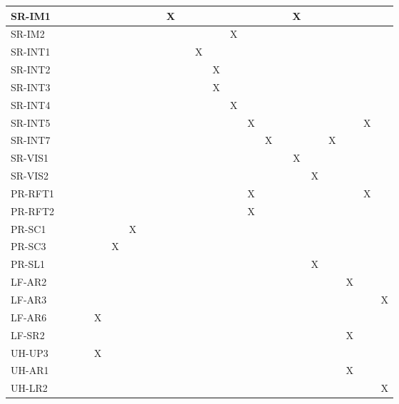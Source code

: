 \documentclass[12pt, titlepage]{article}
\begin{document}
\begin{table}[H]
{\begin{tabular}{|l|c|c|c|c|c|c|c|c|c|c|c|c|c|c|c|c|c|c|c|c|c|c|}
SR-IM1 &  &  &  &  &  &  &  &  & X &  &  &  &  &  &  &  & X &  &  &  &  &  \\ \hline
SR-IM2 &  &  &  &  &  &  &  &  &  &  &  &  & X &  &  &  &  &  &  &  &  &  \\ \hline

SR-INT1 &  &  &  &  &  &  &  &  &  &  & X &  &  &  &  &  &  &  &  &  &  &  \\ \hline
SR-INT2 &  &  &  &  &  &  &  &  &  &  &  & X &  &  &  &  &  &  &  &  &  &  \\ \hline
SR-INT3 &  &  &  &  &  &  &  &  &  &  &  & X &  &  &  &  &  &  &  &  &  &  \\ \hline
SR-INT4 &  &  &  &  &  &  &  &  &  &  &  &  & X &  &  &  &  &  &  &  &  &  \\ \hline
SR-INT5 &  &  &  &  &  &  &  &  &  &  &  &  &  & X &  &  &  &  &  &  & X &  \\ \hline
SR-INT7 &  &  &  &  &  &  &  &  &  &  &  &  &  &  & X &  &  &  & X &  &  &  \\ \hline

SR-VIS1 &  &  &  &  &  &  &  &  &  &  &  &  &  &  &  &  & X &  &  &  &  &  \\ \hline
SR-VIS2 &  &  &  &  &  &  &  &  &  &  &  &  &  &  &  &  &  & X &  &  &  &  \\ \hline

PR-RFT1 &  &  &  &  &  &  &  &  &  &  &  &  &  & X &  &  &  &  &  &  & X &  \\ \hline
PR-RFT2 &  &  &  &  &  &  &  &  &  &  &  &  &  & X &  &  &  &  &  &  &  &  \\ \hline
PR-SC1  &  &  &  &  &  & X &  &  &  &  &  &  &  &  &  &  &  &  &  &  &  &  \\ \hline
PR-SC3  &  &  &  &  & X &  &  &  &  &  &  &  &  &  &  &  &  &  &  &  &  &  \\ \hline
PR-SL1  &  &  &  &  &  &  &  &  &  &  &  &  &  &  &  &  &  & X &  &  &  &  \\ \hline

LF-AR2 &  &  &  &  &  &  &  &  &  &  &  &  &  &  &  &  &  &  &  & X &  &  \\ \hline
LF-AR3 &  &  &  &  &  &  &  &  &  &  &  &  &  &  &  &  &  &  &  &  &  & X \\ \hline
LF-AR6 &  &  &  & X &  &  &  &  &  &  &  &  &  &  &  &  &  &  &  &  &  &  \\ \hline
LF-SR2 &  &  &  &  &  &  &  &  &  &  &  &  &  &  &  &  &  &  &  & X &  &  \\ \hline

UH-UP3 &  &  &  & X &  &  &  &  &  &  &  &  &  &  &  &  &  &  &  &  &  &  \\ \hline
UH-AR1 &  &  &  &  &  &  &  &  &  &  &  &  &  &  &  &  &  &  &  & X &  &  \\ \hline
UH-LR2 &  &  &  &  &  &  &  &  &  &  &  &  &  &  &  &  &  &  &  &  &  & X \\ \hline


\end{tabular}}
\end{table}
\end{document}
